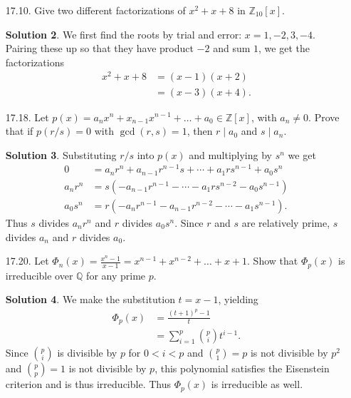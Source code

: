 \documentclass{article}
\newcommand{\QQ}{\mathbb{Q}}
\newcommand{\ZZ}{\mathbb{Z}}
\theoremstyle{definition}
\newtheorem*{solution}{Solution}
\begin{document}
\begin{enumerate}
\begin{solution}
Similarly, $f(x) = x^3 + ax^2 + bx + c$ is irreducible when $g(0) = c = 1$ and $g(1) = 1 + a + b + c = 1$, yielding $a = 1$ and $b= 0$ or $a = 0$ and $b = 1$.  Thus the irreducible polynomials are
\[
x^2 + x + 1, \\
x^3 + x + 1, \\
x^3 + x^2 + 1.
\]
\end{solution}
\item[17.10.] Give two different factorizations of $x^2 + x + 8$ in $\ZZ_{10}[x]$.
\begin{solution}
We first find the roots by trial and error: $x = 1, -2, 3, -4$.  Pairing these up so that they have product $-2$ and sum $1$, we get the factorizations
\begin{align*}
x^2 + x + 8 &= (x - 1)(x + 2) \\
&= (x - 3)(x + 4).
\end{align*}
\end{solution}
\item[17.18.] Let $p(x) = a_nx^n + x_{n-1}x^{n-1} + \dots + a_0 \in \ZZ[x]$, with $a_n \ne 0$.  Prove that if $p(r/s) = 0$ with $\gcd(r, s) = 1$, then $r \mid a_0$ and $s \mid a_n$.
\begin{solution}
Substituting $r/s$ into $p(x)$ and multiplying by $s^n$ we get
\begin{align*}
0 &= a_nr^n + a_{n-1}r^{n-1}s + \cdots + a_1 r s^{n-1} + a_0s^n \\
a_nr^n &= s(-a_{n-1}r^{n-1} - \cdots - a_1 r s^{n-2} - a_0 s^{n-1}) \\
a_0s^n &= r(-a_nr^{n-1} - a_{n-1}r^{n-2} - \cdots - a_1 s^{n-1}).
\end{align*}
Thus $s$ divides $a_nr^n$ and $r$ divides $a_0s^n$.  Since $r$ and $s$ are relatively prime, $s$ divides $a_n$ and $r$ divides $a_0$.
\end{solution}
\item[17.20.] Let $\Phi_n(x) = \frac{x^n-1}{x-1} = x^{n-1} + x^{n-2} + \dots + x + 1.$ Show that $\Phi_p(x)$ is irreducible over $\QQ$ for any prime $p$.
\begin{solution}
We make the substitution $t = x-1$, yielding
\begin{align*}
\Phi_p(x) &= \frac{(t+1)^p - 1}{t} \\
&= \sum_{i = 1}^p \binom{p}{i} t^{i-1}.
\end{align*}
Since $\binom{p}{i}$ is divisible by $p$ for $0 < i < p$ and $\binom{p}{1} = p$ is not divisible by $p^2$ and $\binom{p}{p} = 1$ is not divisible by $p$, this polynomial satisfies the Eisenstein criterion and is thus irreducible.  Thus $\Phi_p(x)$ is irreducible as well.

\end{solution}
\end{enumerate}
\end{document}
